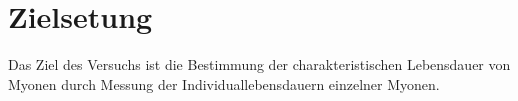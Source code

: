 \section{Zielsetung}
Das Ziel des Versuchs ist die Bestimmung der charakteristischen Lebensdauer von Myonen durch Messung der Individuallebensdauern einzelner Myonen.